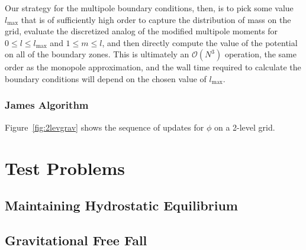 \documentclass[12pt,preprint]{aastex}
\begin{document}
Our strategy for the multipole boundary conditions, then, is to pick some value $l_{\text{max}}$ that is of sufficiently high order to capture the distribution of mass on the grid, evaluate the discretized analog of the modified multipole moments for $0 \leq l \leq l_{\text{max}}$ and $1 \leq m \leq l$, and then directly compute the value of the potential on all of the boundary zones. This is ultimately an $\mathcal{O}(N^3)$ operation, the same order as the monopole approximation, and the wall time required to calculate the boundary conditions will depend on the chosen value of $l_{\text{max}}$.


\subsubsection{James Algorithm}

Figure~\ref{fig:2levgrav} shows the sequence of updates for $\phi$ on a 2-level grid.


\section{Test Problems}\label{Sec:Tests}

\subsection{Maintaining Hydrostatic Equilibrium}\label{Sec:HSE}

\subsection{Gravitational Free Fall}\label{Sec:Gravitational Free Fall}
\end{document}
